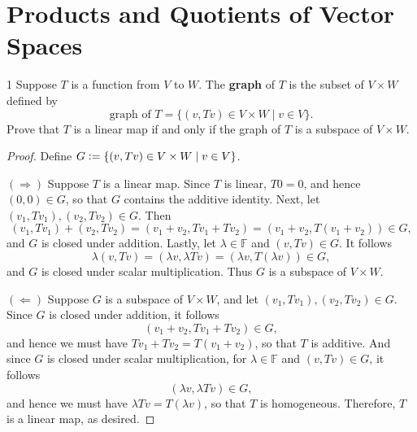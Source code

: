 \documentclass{extarticle}
\newenvironment{problem}[1]{\begin{prob*}{#1}{}}{\end{prob*}}
\newcommand{\F}{\mathbb{F}}
\newcommand{\defeq}{\vcentcolon=}
\begin{document}
\section{Products and Quotients of Vector Spaces}

\begin{problem}{1}
Suppose $T$ is a function from $V$ to $W$.  The \textbf{graph} of $T$ is the subset of $V\times W$ defined by
\begin{equation*}
\text{graph of }T=\{(v,Tv)\in V\times W\mid v\in V\}. 
\end{equation*}
Prove that $T$ is a linear map if and only if the graph of $T$ is a subspace of $V\times W$.  
\end{problem}
\begin{proof}
Define $G \defeq \{(v, Tv)\in V\times W \mid v\in V\}$.
\par $(\Rightarrow)$ Suppose $T$ is a linear map.  Since $T$ is linear, $T0 =0$, and hence $(0, 0)\in G$, so that $G$ contains the additive identity.  Next, let $(v_1, Tv_1),(v_2,Tv_2)\in G$.  Then
\begin{equation*}
(v_1, Tv_1) + (v_2,Tv_2) = (v_1 + v_2, Tv_1 + Tv_2) = (v_1 + v_2, T(v_1 + v_2))\in G,
\end{equation*} 
and $G$ is closed under addition.  Lastly, let $\lambda\in\F$ and $(v, Tv)\in G$.  It follows
\begin{equation*}
\lambda(v, Tv) = (\lambda v, \lambda Tv) = (\lambda v, T(\lambda v))\in G,
\end{equation*}
and $G$ is closed under scalar multiplication.  Thus $G$ is a subspace of $V\times W$.  
\par $(\Leftarrow)$ Suppose $G$ is a subspace of $V\times W$, and let $(v_1, Tv_1),(v_2, Tv_2)\in G$.  Since $G$ is closed under addition, it follows
\begin{equation*}
(v_1 + v_2, Tv_1 + Tv_2)\in G,
\end{equation*}
and hence we must have $Tv_1 + Tv_2 = T(v_1 + v_2)$, so that $T$ is additive.  And since $G$ is closed under scalar multiplication, for $\lambda\in \F$ and $(v, Tv)\in G$, it follows
\begin{equation*}
(\lambda v, \lambda Tv)\in G,
\end{equation*}
and hence we must have $\lambda Tv = T(\lambda v)$, so that $T$ is homogeneous.  Therefore, $T$ is a linear map, as desired.
\end{proof}
\end{document}
